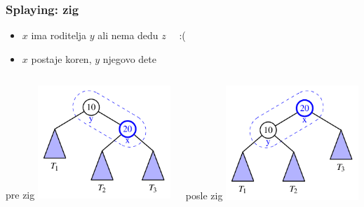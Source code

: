 \documentclass[compress,aspectratio=169]{beamer}
\begin{document}
\begin{frame}[fragile]
  \frametitle{Splaying: zig}
  \begin{itemize}
    \item $x$ ima roditelja $y$ ali nema dedu $z$ \ \ :(
    \item $x$ postaje koren, $y$ njegovo dete
  \end{itemize}
  \begin{columns}
    \begin{column}[t]{6cm}
      \begin{center}
        pre zig
        \includegraphics[width=5cm]{asp-11-pic20a.pdf}
      \end{center}
    \end{column}  
    \begin{column}[t]{6cm}
      \begin{center}
        posle zig
        \includegraphics[width=5cm]{asp-11-pic20b.pdf}
      \end{center}
    \end{column}  
  \end{columns}
\end{frame}
\end{document}
